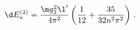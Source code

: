 \begin{equation}
\d E_n^{(2)}=\frac{\m g_2^2\l'}{4\pi^2}\left(\frac{1}{12}+\frac{35}{32n^2\pi^2}\right)\,.
\end{equation}

